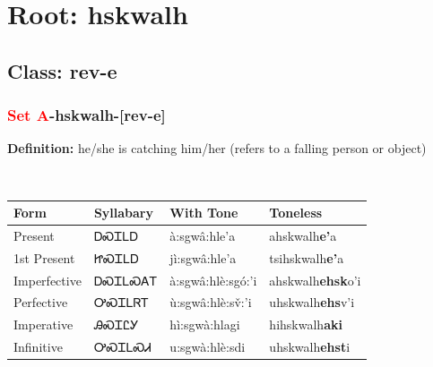 \needspace{4in}
\section*{Root: hskwalh}
\nopagebreak
{}
\needspace{3in}
\subsection*{Class: rev-e}
\nopagebreak
\needspace{2in}
\subsubsection*{\textcolor{Red}{Set A}{-}\textbf{hskwalh}{-}[rev-e]}
\nopagebreak
\textbf{Definition: } he/she is catching him/her (refers to a falling person or object)
\\[0.5em]
\begin{tabularx}{\textwidth}{l X X X}%
\toprule%
\textbf{Form}&\textbf{Syllabary}&\textbf{With Tone}&\textbf{Toneless}\\%
\midrule%
Present&ᎠᏍᏆᏞᎠ&à:sgwâ:hle’a&ahskwalh\textbf{e'}a\\%
1st Present&ᏥᏍᏆᏞᎠ&jì:sgwâ:hle’a&tsihskwalh\textbf{e'}a\\%
Imperfective&ᎠᏍᏆᏞᏍᎪᎢ&à:sgwâ:hlè:sgó:’i&ahskwalh\textbf{ehsk}o'i\\%
Perfective&ᎤᏍᏆᏞᏒᎢ&ù:sgwâ:hlè:sv̌:’i&uhskwalh\textbf{ehs}v'i\\%
Imperative&ᎯᏍᏆᏝᎩ&hì:sgwà:hlagi&hihskwalh\textbf{aki}\\%
Infinitive&ᎤᏍᏆᏞᏍᏗ&u:sgwà:hlè:sdi&uhskwalh\textbf{ehst}i\\%
\bottomrule%
\end{tabularx}
\\[1em]